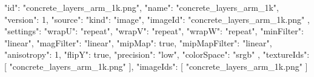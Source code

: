 {
  "id": "concrete_layers_arm_1k.png",
  "name": "concrete_layers_arm_1k",
  "version": 1,
  "source": {
    "kind": "image",
    "imageId": "concrete_layers_arm_1k.png"
  },
  "settings": {
    "wrapU": "repeat",
    "wrapV": "repeat",
    "wrapW": "repeat",
    "minFilter": "linear",
    "magFilter": "linear",
    "mipMap": true,
    "mipMapFilter": "linear",
    "anisotropy": 1,
    "flipY": true,
    "precision": "low",
    "colorSpace": "srgb"
  },
  "textureIds": [
    "concrete_layers_arm_1k.png"
  ],
  "imageIds": [
    "concrete_layers_arm_1k.png"
  ]
}
